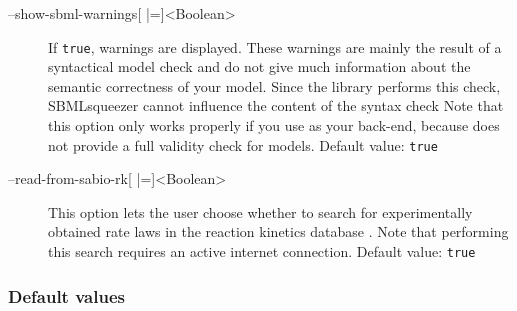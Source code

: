 \begin{description}
\item[--show-sbml-warnings{[} |={]}<Boolean>]
  If \texttt{true}, \SBML warnings are displayed. These warnings are
  mainly the result of a syntactical model check and do not give much
  information about the semantic correctness of your model.
  Since the \SBML library performs this check, SBMLsqueezer cannot influence the
  content of the syntax check Note that this option only works properly if you
  use \libSBML as your \SBML back-end, because \JSBML does not provide a full
  validity check for \SBML models.
  Default value: \texttt{true}

\item[--read-from-sabio-rk{[} |={]}<Boolean>]
  This option lets the user choose whether to search for experimentally
  obtained rate laws in the reaction kinetics database \SABIO. Note that
  performing this search requires an active internet connection.
  Default value: \texttt{true}
\end{description}

\subsubsection{Default values}

